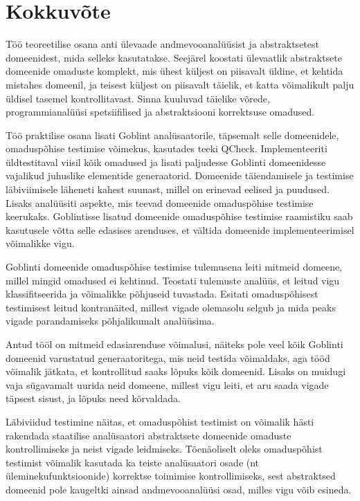 \documentclass[../thesis.tex]{subfiles}
\begin{document}
\section{Kokkuvõte}
Töö teoreetilise osana anti ülevaade andmevooanalüüsist ja abstraktsetest domeenidest, mida selleks kasutatakse. Seejärel koostati ülevaatlik abstraktsete domeenide omaduste komplekt, mis ühest küljest on piisavalt üldine, et kehtida mistahes domeenil, ja teisest küljest on piisavalt täielik, et katta võimalikult palju üldisel tasemel kontrollitavast. Sinna kuuluvad täielike võrede, programmianalüüsi spetsiifilised ja abstraktsiooni korrektsuse omadused.

Töö praktilise osana lisati Goblint analüsaatorile, täpsemalt selle domeenidele, omaduspõhise testimise võimekus, kasutades teeki QCheck. Implementeeriti üldtestitaval viisil kõik omadused ja lisati paljudesse Goblinti domeenidesse vajalikud juhuslike elementide generaatorid. Domeenide täiendamisele ja testimise läbiviimisele läheneti kahest suunast, millel on erinevad eelised ja puudused. Lisaks analüüsiti aspekte, mis teevad domeenide omaduspõhise testimise keerukaks. Goblintisse lisatud domeenide omaduspõhise testimise raamistiku saab kasutusele võtta selle edasises arenduses, et vältida domeenide implementeerimisel võimalikke vigu.

Goblinti domeenide omaduspõhise testimise tulemusena leiti mitmeid domeene, millel mingid omadused ei kehtinud. Teostati tulemuste analüüs, et leitud vigu klassifitseerida ja võimalikke põhjuseid tuvastada. Esitati omaduspõhisest testimisest leitud kontranäited, millest vigade olemasolu selgub ja mida peaks vigade parandamiseks põhjalikumalt analüüsima.

Antud tööl on mitmeid edasiarenduse võimalusi, näiteks pole veel kõik Goblinti domeenid varustatud generaatoritega, mis neid testida võimaldaks, aga tööd võimalik jätkata, et kontrollitud saaks lõpuks kõik domeenid. Lisaks on muidugi vaja sügavamalt uurida neid domeene, millest vigu leiti, et aru saada vigade täpsest sisust, ja lõpuks need kõrvaldada.

Läbiviidud testimine näitas, et omaduspõhist testimist on võimalik hästi rakendada staatilise analüsaatori abstraktsete domeenide omaduste kontrollimiseks ja neist vigade leidmiseks. Tõenäoliselt oleks omaduspõhist testimist võimalik kasutada ka teiste analüsaatori osade (nt üleminekufunktsioonide) korrektse toimimise kontrollimiseks, sest abstraktsed domeenid pole kaugeltki ainsad andmevooanalüüsi osad, milles vigu võib esineda.
\end{document}
